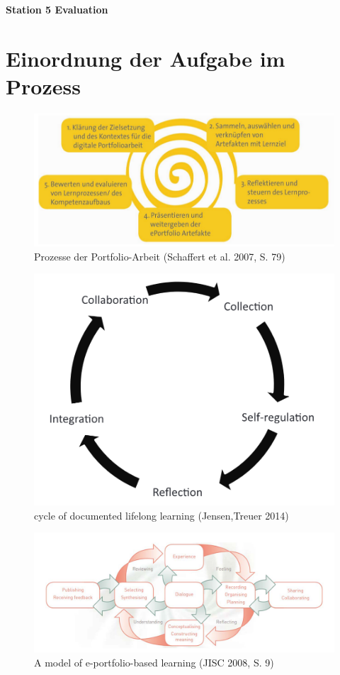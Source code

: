 \documentclass[a4paper,oneside]{scrarticle}
\begin{document}
	\pagestyle{fancy}
	\fancyhead{} %
	\fancyfoot{} %
	\begin{center}
		\begin{LARGE}
			\textbf{Station 5 Evaluation}
		\end{LARGE}
	\end{center}
	
	\section*{Einordnung der Aufgabe im Prozess}
	\begin{figure} [h]
		\centering
		\includegraphics[width=0.7\linewidth]{e-portfolio-prozesse-schaffert}
		\caption{Prozesse der Portfolio-Arbeit (Schaffert et al. 2007, S. 79)\cite{schaffert_e-portfolio-einsatz_2007}}
		\label{fig:e-portfolio-prozesse-schaffert}
	\end{figure}
	\begin{figure}[h]
		\centering
		\includegraphics[width=0.5\linewidth]{cycle-of-documented-lifelong-learning-Jensen}
		\caption{cycle of documented lifelong learning (Jensen,Treuer 2014)\cite{jenson_defining_2014}}
		\label{fig:cycle-of-documented-lifelong-learning-jensen}
	\end{figure}
	\begin{figure}[h]
		\centering
		\includegraphics[width=0.8\linewidth]{model-of-e-portfolio-based-learning}
		\caption{A model of e-portfolio-based learning (JISC 2008, S. 9) \cite{jisc_effective_2008}}
		\label{fig:model-of-e-portfolio-based-learning}
	\end{figure}
	
\end{document}
